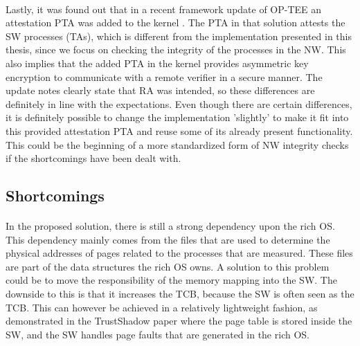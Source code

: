 \paragraph*{}
Lastly, it was found out that in a recent framework update of OP-TEE an attestation PTA was added to the kernel \cite{OPTEE3.17}. The PTA in that solution attests the SW processes (TAs), which is different from the implementation presented in this thesis, since we focus on checking the integrity of the processes in the NW. This also implies that the added PTA in the kernel provides asymmetric key encryption to communicate with a remote verifier in a secure manner. The update notes clearly state that RA was intended, so these differences are definitely in line with the expectations. Even though there are certain differences, it is definitely possible to change the implementation 'slightly' to make it fit into this provided attestation PTA and reuse some of its already present functionality. This could be the beginning of a more standardized form of NW integrity checks if the shortcomings have been dealt with.

\subsection*{Shortcomings}

\paragraph*{}
In the proposed solution, there is still a strong dependency upon the rich OS. This dependency mainly comes from the files that are used to determine the physical addresses of pages related to the processes that are measured. These files are part of the data structures the rich OS owns. A solution to this problem could be to move the responsibility of the memory mapping into the SW. The downside to this is that it increases the TCB, because the SW is often seen as the TCB. This can however be achieved in a relatively lightweight fashion, as demonstrated in the TrustShadow paper where the page table is stored inside the SW, and the SW handles page faults that are generated in the rich OS. 


